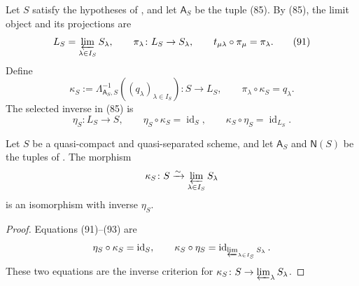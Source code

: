 \begin{definition}
  \label{def:nagata-glued-limit-comparison}

  Let \(S\) satisfy the hypotheses of
  , and let
  \(\mathsf A_S\) be the tuple (85).  By (85), the limit object and its
  projections are
  \[
    L_S=\varprojlim_{\lambda\in I_S}S_\lambda,\qquad
    \pi_\lambda\colon L_S\to S_\lambda,\qquad
    t_{\mu\lambda}\circ\pi_\mu=\pi_\lambda.                         \tag{91}
  \]
  Define
  \[
    \kappa_S
      :=\Lambda_{\mathsf A_S,S}^{-1}
          ((q_\lambda)_{\lambda\in I_S})
      \colon S\longrightarrow L_S,\qquad
    \pi_\lambda\circ\kappa_S=q_\lambda.                             \tag{92}
  \]
  The selected inverse in (85) is
  \[
    \eta_S\colon L_S\to S,\qquad
    \eta_S\circ\kappa_S=\operatorname{id}_S,\qquad
    \kappa_S\circ\eta_S=\operatorname{id}_{L_S}.                    \tag{93}
  \]
\end{definition}

\begin{lemma}
  \label{lemma:nagata-glued-limit-recovery}

  Let $S$ be a quasi-compact and quasi-separated scheme, and let
  $\mathsf A_S$ and $\mathsf N(S)$ be the tuples of
  .  The morphism
  \[
    \kappa_S\colon S\xrightarrow{\sim}
      \varprojlim_{\lambda\in I_S}S_\lambda
  \]
  is an isomorphism with inverse \(\eta_S\).
\end{lemma}

\begin{proof}
  Equations (91)--(93) are
  \[
    \eta_S\circ\kappa_S=\operatorname{id}_S,\qquad
    \kappa_S\circ\eta_S
      =\operatorname{id}_{\varprojlim_{\lambda\in I_S}S_\lambda}.
  \]
  These two equations are the inverse criterion for
  \(\kappa_S\colon S\to\varprojlim_\lambda S_\lambda\).
\end{proof}

